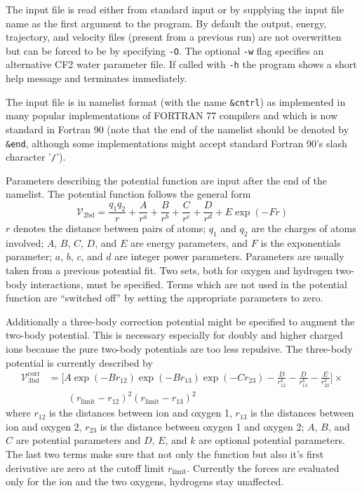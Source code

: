 \documentclass[12pt,a4paper]{article}
\newcommand{\Code}[1]{\texttt{#1}}
\begin{document}
The input file is read either from standard input or by supplying the input
file name as the first argument to the program.  By default the output, energy,
trajectory, and velocity files (present from a previous run) are not
overwritten but can be forced to be by specifying \Code{-O}.  The optional
\Code{-w} flag specifies an alternative CF2
water\cite{Stillinger:JChemPhys-68-2-666,Jansco:ChemPhys-85-377,%
  Bopp:ChemPhysLett-98-2-129} parameter file.  If called with \Code{-h} the
program shows a short help message and terminates immediately.

The input file is in namelist format (with the name \Code{\&cntrl}) as
implemented in many popular implementations of FORTRAN 77 compilers and which
is now standard in Fortran 90 (note that the end of the namelist should be
denoted by \Code{\&end}, although some implementations might accept standard
Fortran 90's slash character '\Code{/}').

Parameters describing the potential function are input after the end of the
namelist.  The potential function follows the general form
\begin{equation}
  \label{eq:two-body}
  \mathscr{V}_{\text{2bd}} = \frac{q_1q_2}{r} + \frac{A}{r^a} + \frac{B}{r^b} +
  \frac{C}{r^c} + \frac{D}{r^d} + E\exp(-Fr)
\end{equation}
$r$ denotes the distance between pairs of atoms; $q_1$ and $q_2$ are the
charges of atoms involved; $A$, $B$, $C$, $D$, and $E$ are energy parameters,
and $F$ is the exponentials parameter; $a$, $b$, $c$, and $d$ are integer power
parameters.  Parameters are usually taken from a previous potential fit.  Two
sets, both for oxygen and hydrogen two-body interactions, must be specified.
Terms which are not used in the potential function are ``switched off'' by
setting the appropriate parameters to zero.

Additionally a three-body correction potential might be specified to augment
the two-body potential.  This is necessary especially for doubly and higher
charged ions because the pure two-body potentials are too less repulsive.
The three-body potential is currently described by
\begin{equation}
  \label{eq:three-body}
  \begin{split}
  \mathscr{V}_{\text{3bd}}^{\text{corr}}  &= \Biggl[A \exp{(-Br_{12})}
  \exp{(-Br_{13})} \exp{(-Cr_{23})} - \frac{D}{r_{12}^k} - \frac{D}{r_{13}^k} -
  \frac{E}{r_{23}^k}\Biggr] \times \\
  & \qquad (r_{\text{limit}} - r_{12})^2 (r_{\text{limit}} - r_{13})^2
  \end{split}
\end{equation}
where $r_{12}$ is the distances between ion and oxygen 1, $r_{13}$ is the
distances between ion and oxygen 2, $r_{23}$ is the distance between oxygen 1
and oxygen 2; $A$, $B$, and $C$ are potential parameters and $D$, $E$, and $k$
are optional potential parameters.  The last two terms make sure that not only
the function but also it's first derivative are zero at the cutoff limit
$r_{\text{limit}}$.  Currently the forces are evaluated only for the ion and
the two oxygens, hydrogens stay unaffected.
\end{document}
